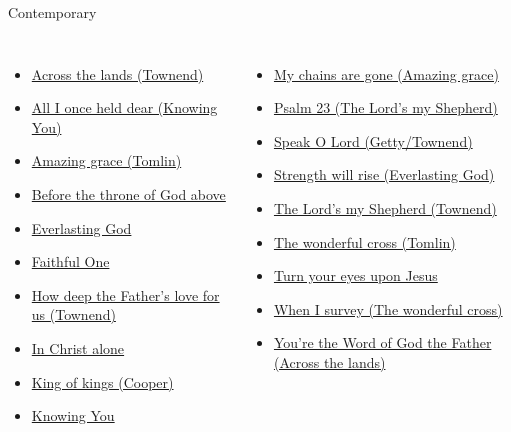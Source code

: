 \documentclass{beamer}
\begin{document}
\begin{frame}{Contemporary}
\begin{columns}
    \begin{itemize}
    \item \hyperlink{Across the lands["You're the Word of God the Father"](Townend)1}{Across the lands (Townend)}
    \item \hyperlink{Knowing You['All I once held dear']1}{All I once held dear (Knowing You)}
    \item \hyperlink{Amazing grace['My chains are gone'](Tomlin)1}{Amazing grace (Tomlin)}
    \item \hyperlink{Before the throne of God above[]1}{Before the throne of God above }
    \item \hyperlink{Everlasting God['Strength will rise']V}{Everlasting God }
    \item \hyperlink{Faithful One[]V}{Faithful One }
    \item \hyperlink{How deep the Father's love for us[](Townend)1}{How deep the Father's love for us (Townend)}
    \item \hyperlink{In Christ alone[]1}{In Christ alone }
    \item \hyperlink{King of kings[](Cooper)1}{King of kings (Cooper)}
    \item \hyperlink{Knowing You['All I once held dear']1}{Knowing You }
\end{itemize}
    \begin{itemize}
    \item \hyperlink{Amazing grace['My chains are gone'](Tomlin)1}{My chains are gone (Amazing grace)}
    \item \hyperlink{The Lord's my Shepherd['Psalm 23'](Townend)1}{Psalm 23 (The Lord's my Shepherd)}
    \item \hyperlink{Speak O Lord[](Getty/Townend)1}{Speak O Lord (Getty/Townend)}
    \item \hyperlink{Everlasting God['Strength will rise']V}{Strength will rise (Everlasting God)}
    \item \hyperlink{The Lord's my Shepherd['Psalm 23'](Townend)1}{The Lord's my Shepherd (Townend)}
    \item \hyperlink{The wonderful cross['When I survey'](Tomlin)1}{The wonderful cross (Tomlin)}
    \item \hyperlink{Turn your eyes upon Jesus[]1}{Turn your eyes upon Jesus }
    \item \hyperlink{The wonderful cross['When I survey'](Tomlin)1}{When I survey (The wonderful cross)}
    \item \hyperlink{Across the lands["You're the Word of God the Father"](Townend)1}{You're the Word of God the Father (Across the lands)}
\end{itemize}


\end{columns}

\end{frame}
\end{document}
